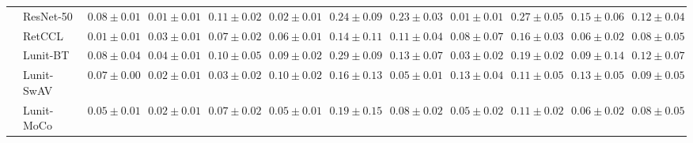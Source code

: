 \begin{tabular}{ll|cccc|c|cccc|c}
 & ResNet-50 & $0.08 \pm 0.01$ & $\mathbf{0.01 \pm 0.01}$ & $0.11 \pm 0.02$ & $0.02 \pm 0.01$ & $0.24 \pm 0.09$ & $0.23 \pm 0.03$ & $\mathbf{0.01 \pm 0.01}$ & $0.27 \pm 0.05$ & $0.15 \pm 0.06$ & $0.12 \pm 0.04$ \\
 & RetCCL & $0.01 \pm 0.01$ & $0.03 \pm 0.01$ & $0.07 \pm 0.02$ & $0.06 \pm 0.01$ & $0.14 \pm 0.11$ & $0.11 \pm 0.04$ & $0.08 \pm 0.07$ & $0.16 \pm 0.03$ & $0.06 \pm 0.02$ & $0.08 \pm 0.05$ \\
 & Lunit-BT & $0.08 \pm 0.04$ & $0.04 \pm 0.01$ & $0.10 \pm 0.05$ & $0.09 \pm 0.02$ & $0.29 \pm 0.09$ & $0.13 \pm 0.07$ & $0.03 \pm 0.02$ & $0.19 \pm 0.02$ & $0.09 \pm 0.14$ & $0.12 \pm 0.07$ \\
 & Lunit-SwAV & $0.07 \pm 0.00$ & $0.02 \pm 0.01$ & $0.03 \pm 0.02$ & $0.10 \pm 0.02$ & $0.16 \pm 0.13$ & $0.05 \pm 0.01$ & $0.13 \pm 0.04$ & $0.11 \pm 0.05$ & $0.13 \pm 0.05$ & $0.09 \pm 0.05$ \\
 & Lunit-MoCo & $0.05 \pm 0.01$ & $0.02 \pm 0.01$ & $0.07 \pm 0.02$ & $0.05 \pm 0.01$ & $0.19 \pm 0.15$ & $0.08 \pm 0.02$ & $0.05 \pm 0.02$ & $0.11 \pm 0.02$ & $0.06 \pm 0.02$ & $0.08 \pm 0.05$ \\
\cline{1-12}
\bottomrule
\end{tabular}
